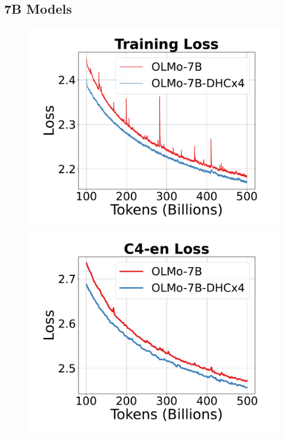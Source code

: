 \documentclass{article} %
\begin{document}
\subsection{7B Models}
\begin{figure}[h]
    \centering
    \begin{minipage}{0.25\textwidth}
        \centering
        \includegraphics[width=\linewidth]{fig/train_loss_7b_exp_099.pdf}
        
    \end{minipage}\hfill
    \begin{minipage}{0.25\textwidth}
        \centering
        \includegraphics[width=\linewidth]{fig/7B_C4-en_Loss.pdf}


\end{minipage}
\end{figure}
\end{document}

